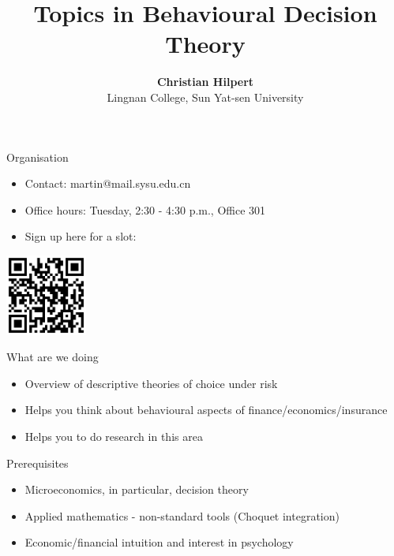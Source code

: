 \documentclass[11pt, aspectratio=169]{beamer}
\begin{document}
\title{Topics in Behavioural Decision  Theory}

\author[Christian Hilpert]
{
{\bf Christian Hilpert}\\
{\small Lingnan College, Sun Yat-sen University}\\[1ex]
}


\begin{frame}
    \titlepage
    \note{~}
\end{frame}

\begin{frame}{Organisation}
    \begin{itemize}
        \item Contact: martin@mail.sysu.edu.cn\bigskip
        \item Office hours: Tuesday, 2:30 - 4:30 p.m., Office 301\bigskip
        \item Sign up here for a slot:
    \end{itemize}
    \centering
    \includegraphics[width = 0.2\textwidth]{OfficeHour}

\end{frame}

\begin{frame}{What are we doing}
    \begin{itemize}
        \item Overview of descriptive theories of choice under risk\bigskip
        \item Helps you think about behavioural aspects of finance/economics/insurance\bigskip
        \item Helps you to do research in this area\bigskip
    \end{itemize}
\end{frame}


\begin{frame}{Prerequisites}
    \begin{itemize}
        \item Microeconomics, in particular, decision theory\bigskip
        \item Applied mathematics - non-standard tools (Choquet integration)\bigskip
        \item Economic/financial intuition and interest in psychology\bigskip
    \end{itemize}
\end{frame}
\end{document}
